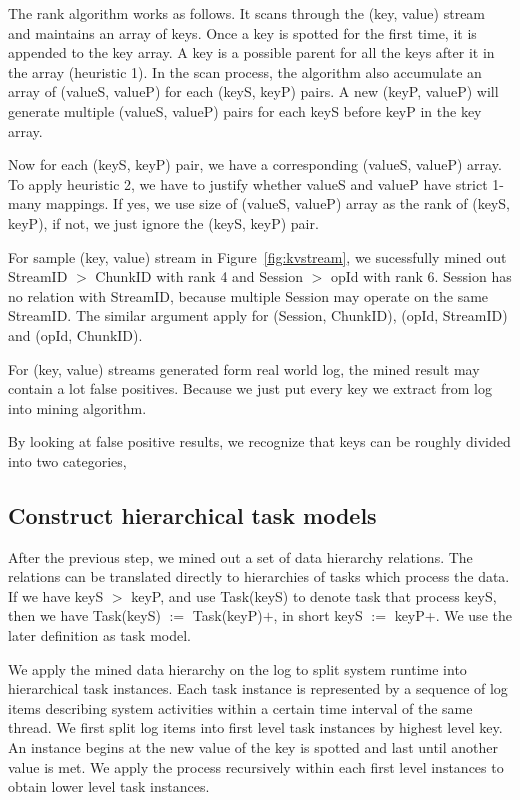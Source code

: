 The rank algorithm works as follows. It scans through the
(key, value) stream and maintains an array of keys. Once a
key is spotted for the first time, it is appended to the key
array. A key is a possible parent for all the keys after it
in the array (heuristic 1). In the scan process, the algorithm also
accumulate an array of (valueS, valueP) for each (keyS, keyP)
pairs. A new (keyP, valueP) will generate multiple (valueS,
valueP) pairs for each keyS before keyP in the key array.

Now for each (keyS, keyP) pair, we have a corresponding
(valueS, valueP) array. To apply heuristic 2, we have to
justify whether valueS and valueP have strict 1-many
mappings. If yes, we use size of (valueS, valueP) array
as the rank of (keyS, keyP), if not, we just ignore the
(keyS, keyP) pair.


For sample (key, value) stream in Figure~\ref{fig:kvstream},
we sucessfully mined out StreamID $>$ ChunkID with rank 4
and Session $>$ opId with rank 6. Session has no relation
with StreamID, because multiple Session may operate on the
same StreamID. The similar argument apply for (Session,
ChunkID), (opId, StreamID) and (opId, ChunkID).

For (key, value) streams generated form real world log, the
mined result may contain a lot false positives. Because we
just put every key we extract from log into mining
algorithm.

By looking at false positive results, we recognize that keys
can be roughly divided into two categories, 

\subsection{Construct hierarchical task models}

After the previous step, we mined out a set of data
hierarchy relations. The relations can be translated
directly to hierarchies of tasks which process the data.
If we have keyS $>$ keyP, and use Task(keyS) to denote task
that process keyS, then we have Task(keyS) $:=$
Task(keyP)$+$, in short keyS $:=$ keyP+. We use the later
definition as task model.

We apply the mined data hierarchy on the log to split system
runtime into hierarchical task instances. Each task instance
is represented by a sequence of log items describing system
activities within a certain time interval of the same
thread. We first split log items into first level task
instances by highest level key. An instance begins at the
new value of the key is spotted and last until another value
is met. We apply the process recursively within each first
level instances to obtain lower level task instances.

